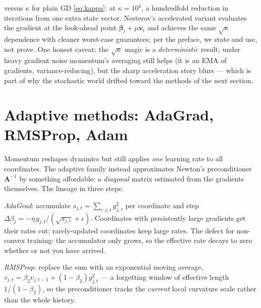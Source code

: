 \documentclass[11pt]{article}
\numberwithin{equation}{section}
\theoremstyle{plain}
\theoremstyle{definition}
\theoremstyle{remark}
\newcommand{\bbeta}{\bm{\beta}}
\begin{document}
versus $\kappa$ for plain GD \eqref{eq:kappa}: at $\kappa = 10^4$, a hundredfold reduction in iterations from one extra state vector. Nesterov's accelerated variant evaluates the gradient at the look-ahead point $\bbeta_t + \mu \bm{v}_t$ and achieves the same $\sqrt{\kappa}$ dependence with cleaner worst-case guarantees; per the preface, we state and use, not prove. One honest caveat: the $\sqrt\kappa$ magic is a \emph{deterministic} result; under heavy gradient noise momentum's averaging still helps (it is an EMA of gradients, variance-reducing), but the sharp acceleration story blurs --- which is part of why the stochastic world drifted toward the methods of the next section.

\section{Adaptive methods: AdaGrad, RMSProp, Adam}\label{sec:adaptive}

Momentum reshapes dynamics but still applies \emph{one} learning rate to all coordinates. The adaptive family instead approximates Newton's preconditioner $\bm{A}^{-1}$ by something affordable: a \emph{diagonal} matrix estimated from the gradients themselves. The lineage in three steps:

\emph{AdaGrad}: accumulate $s_{j,t} = \sum_{\tau \le t} g_{j,\tau}^2$ per coordinate and step $\Delta\beta_j = -\eta\, g_{j,t} / (\sqrt{s_{j,t}} + \epsilon)$. Coordinates with persistently large gradients get their rates cut; rarely-updated coordinates keep large rates. The defect for non-convex training: the accumulator only grows, so the effective rate decays to zero whether or not you have arrived.

\emph{RMSProp}: replace the sum with an exponential moving average, $v_{j,t} = \beta_2 v_{j,t-1} + (1-\beta_2) g_{j,t}^2$ --- a forgetting window of effective length $1/(1-\beta_2)$, so the preconditioner tracks the \emph{current} local curvature scale rather than the whole history.
\end{document}
